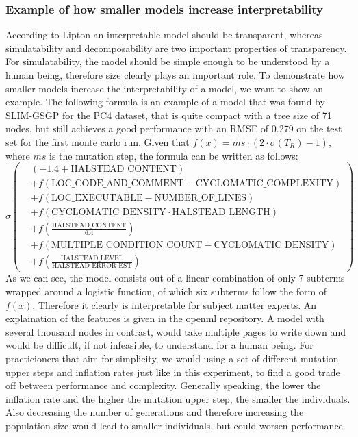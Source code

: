 \documentclass[manuscript, review, anonymous]{acmart} %
\begin{document}
\subsubsection{Example of how smaller models increase interpretability}
According to Lipton \cite{Lipton2016} an interpretable model should be transparent, whereas simulatability and decomposability are two
important properties of transparency. For simulatability, the model should be simple enough to be understood by a human being, therefore size
clearly plays an important role.
To demonstrate how smaller models increase the interpretability of a model, we want to show an example.
The following formula is an example of a model that was found by SLIM-GSGP for the PC4 dataset, that is quite compact with a
tree size of 71 nodes, but still achieves a good performance with an RMSE of 0.279 on the test set for the first monte carlo run.
Given that $f(x) = ms \cdot (2 \cdot \sigma(T_R) - 1)$, 
where $ms$ is the mutation step, the formula can be written as follows:
\[
\sigma\left(
\begin{aligned}
  &(-1.4 + \text{HALSTEAD\_CONTENT}) \\
  &+ f(\text{LOC\_CODE\_AND\_COMMENT} - \text{CYCLOMATIC\_COMPLEXITY}) \\
  &+ f(\text{LOC\_EXECUTABLE} - \text{NUMBER\_OF\_LINES}) \\
  &+ f(\text{CYCLOMATIC\_DENSITY} \cdot \text{HALSTEAD\_LENGTH}) \\
  &+ f\left( \frac{\text{HALSTEAD\_CONTENT}}{6.4} \right) \\
  &+ f(\text{MULTIPLE\_CONDITION\_COUNT} - \text{CYCLOMATIC\_DENSITY}) \\
  &+ f\left( \frac{\text{HALSTEAD\_LEVEL}}{\text{HALSTEAD\_ERROR\_EST}} \right)
\end{aligned}
\right)
\]
As we can see, the model consists out of a linear combination of only 7 subterms wrapped around a logistic function, 
of which six subterms follow the form of $f(x)$. Therefore it clearly is interpretable for subject matter experts. An explaination
of the features is given in the openml repository. 
A model with several thousand nodes in contrast, would take multiple pages to write down and would be difficult, 
if not infeasible, to understand for a human being.
For practicioners that aim for simplicity, we would using a set of different mutation upper steps and inflation rates just like 
in this experiment, to find a good trade off between performance and complexity. Generally speaking, the lower the inflation rate
and the higher the mutation upper step, the smaller the individuals. Also decreasing the number of generations and therefore increasing
the population size would lead to smaller individuals, but could worsen performance.
\end{document}
